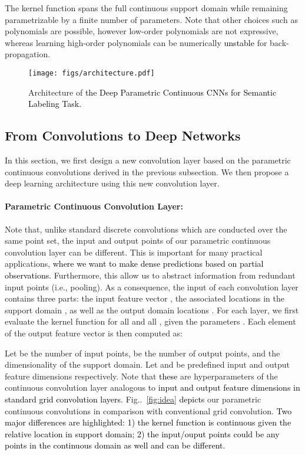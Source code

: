 \documentclass[10pt,twocolumn,letterpaper]{article}
\makeatletter
\newcommand\shenlong[1]{\textcolor{black}{#1}}
\newcommand\simon[1]{\textcolor{black}{#1}}
\def\@onedot{\ifx\@let@token.\else.\null\fi\xspace}
\DeclareRobustCommand\onedot{\futurelet\@let@token\@onedot}
\newcommand{\figref}[1]{Fig\onedot~\ref{#1}}
\makeatother
\begin{document}
The kernel function  spans the full continuous support domain while remaining parametrizable  by a finite number of parameters. 
Note that other choices such as polynomials are possible, however low-order polynomials are not expressive, whereas  learning  high-order polynomials can be numerically 
\simon{unstable} for back-propagation. 

\begin{figure*}
  \centering
  \texttt{[image: figs/architecture.pdf]}
  \vspace{-3mm}
  \caption{Architecture of \shenlong{the Deep Parametric Continuous CNNs for Semantic Labeling Task.}} 
  \label{fig:network}
\end{figure*}

\subsection{From Convolutions to Deep Networks}


In this section, we first design a new convolution layer based on the  parametric continuous convolutions derived in the previous subsection. We then propose a deep learning architecture using this new convolution layer. 



\paragraph{Parametric Continuous Convolution Layer: }
Note that, unlike standard discrete convolutions which  are conducted over the same point set, the input and output points of our parametric continuous  convolution layer can be different. This is important for many practical applications, \simon{where we want to make dense predictions based on partial observations.} 
Furthermore, this allow us to abstract information from redundant input points (i.e., pooling). 
As a consequence, the input of each convolution  layer contains three parts: the input feature vector ,  the associated locations  
in the support domain , as well as the output domain locations .   For each layer, we first  evaluate the kernel function 
  for all  and   all , given the  parameters . Each element of the output feature vector is then computed as:

Let  be the number of input points,   be the number of output points, and   the dimensionality of the support domain. Let 
 and  be predefined input  and output feature dimensions respectively. Note that \simon{these} are hyperparameters of the continuous convolution layer analogous to \shenlong{input and output feature dimensions in standard grid convolution layers.} 
 \figref{fig:idea} 
 \simon{depicts} our parametric continuous convolutions in comparison with conventional grid convolution. \shenlong{Two major differences are highlighted: 1) the kernel function is continuous given the relative location in support domain; 2) the input/ouput points could be any points in the continuous domain as well and can be different. } 
\end{document}
